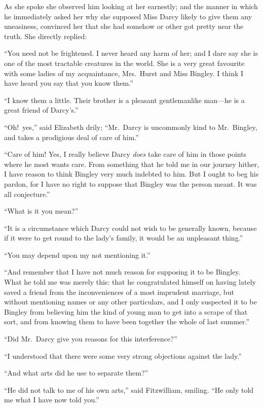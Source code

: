 \documentclass[12pt,english,oneside]{book}
\begin{document}
As she spoke she observed him looking at her earnestly; and the manner
in which he immediately asked her why she supposed Miss Darcy likely
to give them any uneasiness, convinced her that she had somehow or
other got pretty near the truth. She directly replied:

{}``You need not be frightened. I never heard any harm of her; and
I dare say she is one of the most tractable creatures in the world.
She is a very great favourite with some ladies of my acquaintance,
Mrs.\ Hurst and Miss Bingley. I think I have heard you say that you
know them.''

{}``I know them a little. Their brother is a pleasant gentlemanlike
man\mbox{---}he is a great friend of Darcy's.''

{}``Oh!\ yes,'' said Elizabeth drily; {}``Mr.\ Darcy is uncommonly
kind to Mr.\ Bingley, and takes a prodigious deal of care of him.''

{}``Care of him! Yes, I really believe Darcy \textit{does} take care
of him in those points where he most wants care. From something that
he told me in our journey hither, I have reason to think Bingley very
much indebted to him. But I ought to beg his pardon, for I have no
right to suppose that Bingley was the person meant. It was all conjecture.''

{}``What is it you mean?''\ 

{}``It is a circumstance which Darcy could not wish to be generally
known, because if it were to get round to the lady's family, it would
be an unpleasant thing.''

{}``You may depend upon my not mentioning it.''

{}``And remember that I have not much reason for supposing it to
be Bingley. What he told me was merely this: that he congratulated
himself on having lately saved a friend from the inconveniences of
a most imprudent marriage, but without mentioning names or any other
particulars, and I only suspected it to be Bingley from believing
him the kind of young man to get into a scrape of that sort, and from
knowing them to have been together the whole of last summer.''

{}``Did Mr.\ Darcy give you reasons for this interference?''\ 

{}``I understood that there were some very strong objections against
the lady.''

{}``And what arts did he use to separate them?''\ 

{}``He did not talk to me of his own arts,'' said Fitzwilliam, smiling.
{}``He only told me what I have now told you.''
\end{document}
